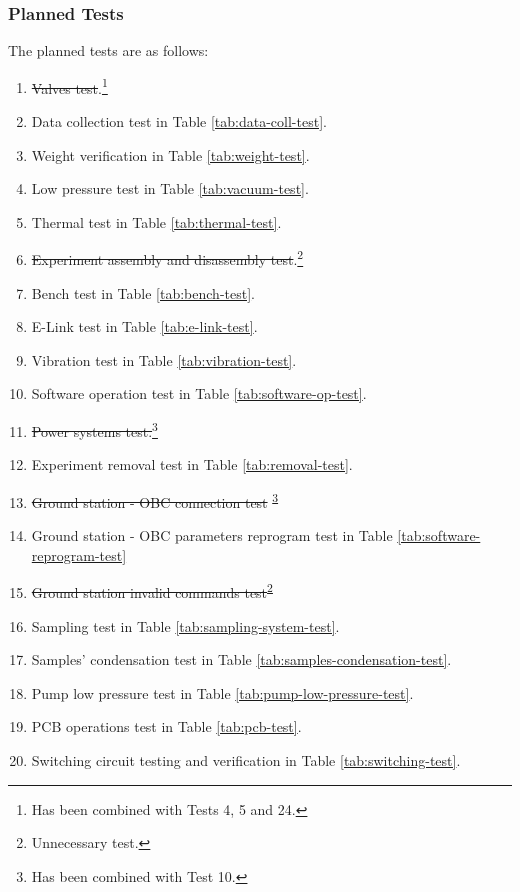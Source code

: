 \documentclass[a4paper,12pt,oneside]{article} %
\begin{document}
\raggedbottom

\subsubsection{Planned Tests}
The planned tests are as follows:

\begin{enumerate}
    \item \st{Valves test}.\footnote{Has been combined with Tests 4, 5 and 24.\label{fn:test-combined}}
    \item Data collection test in Table \ref{tab:data-coll-test}.
    \item Weight verification in Table \ref{tab:weight-test}.
    \item Low pressure test in Table \ref{tab:vacuum-test}.
    \item Thermal test in Table \ref{tab:thermal-test}.
    \item \st{Experiment assembly and disassembly test}.\footnote{Unnecessary test.\label{fn:test-removed}}
    \item Bench test in Table \ref{tab:bench-test}.
    \item E-Link test in Table \ref{tab:e-link-test}.
    \item Vibration test in Table \ref{tab:vibration-test}.
    \item Software operation test in Table \ref{tab:software-op-test}.
    \item \st{Power systems test.}\footnote{Has been combined with Test 10.\label{fn:test-combined10}}
    \item Experiment removal test in Table \ref{tab:removal-test}.
    \item \st{Ground station - OBC connection test} \textsuperscript{\ref{fn:test-combined10}}
    \item Ground station - OBC parameters reprogram test in Table \ref{tab:software-reprogram-test}
    \item \st{Ground station invalid commands test}\textsuperscript{\ref{fn:test-removed}}
    \item Sampling test in Table \ref{tab:sampling-system-test}.
    \item Samples' condensation test in Table \ref{tab:samples-condensation-test}.
    \item Pump low pressure test in Table \ref{tab:pump-low-pressure-test}.
    \item PCB operations test in Table \ref{tab:pcb-test}.
    \item Switching circuit testing and verification in Table \ref{tab:switching-test}.

\end{enumerate}
\end{document}
